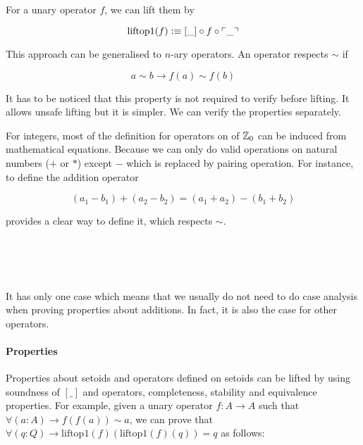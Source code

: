 For a unary operator $f$, we can lift them by 

$$\text{liftop1}(f) \vcentcolon\equiv [\_] \circ f \circ \ulcorner\_\urcorner$$

This approach can be generalised to $n$-ary operators. An operator respects $\sim$ if


$$a \sim b \to f(a) \sim f(b)$$


It has to be noticed that this property is not required to verify before lifting.
It allows unsafe lifting but it is simpler. We can verify the properties separately. 

For integers, most of the definition for operators on of $\mathbb{Z}_0$ can be induced from mathematical equations. Because we can only do valid operations on natural numbers ($+$ or $*$) except $-$ which is replaced by pairing operation. For instance, to define the addition operator

$$(a_1 - b_1) + (a_2 - b_2) = (a_1 + a_2) - (b_1 + b_2)$$

provides a clear way to define it, which respects $\sim$.

\begin{code}
\\
\>\AgdaFunction{\_+\_} \AgdaSymbol{:}     \<%
\\
\>\AgdaSymbol{(} \AgdaInductiveConstructor{,} \AgdaSymbol{)} \AgdaFunction{+} \AgdaSymbol{(} \AgdaInductiveConstructor{,} \AgdaSymbol{)} \AgdaSymbol{=} \AgdaSymbol{(}  \AgdaSymbol{)} \AgdaInductiveConstructor{,} \AgdaSymbol{(}  \AgdaSymbol{)}\<%
\\
\end{code}

It has only one case which means that we usually do not need to do case analysis when proving properties about additions. In fact, it is also the case for other operators.



\paragraph{Properties}

Properties about setoids and operators defined on setoids can be lifted by using soundness of $[\_]$ and operators, completeness, stability and equivalence properties. For example, given a unary operator $f : A \to A$ such that $\forall (a : A) \to f (f (a)) \sim a$, we can prove that $\forall(q : Q) \to \text{liftop1}(f)(\text{liftop1}(f)(q)) = q$ as follows:

